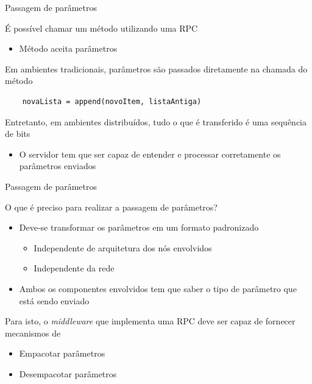 \documentclass[compress]{beamer}
\begin{document}
\begin{frame}[fragile]{Passagem de parâmetros}

É possível chamar um método utilizando uma RPC
\begin{itemize}
    \item Método aceita parâmetros
\end{itemize}

\vspace{0.5cm}

Em ambientes tradicionais, parâmetros são passados diretamente na chamada do método

\begin{verbatim}
    novaLista = append(novoItem, listaAntiga)
\end{verbatim}

Entretanto, em ambientes distribuídos, tudo o que é transferido é uma sequência  de bits
\begin{itemize}
    \item O servidor tem que ser capaz de entender e processar corretamente os parâmetros enviados
\end{itemize}
\end{frame}


\begin{frame}[fragile]{Passagem de parâmetros}

O que é preciso para realizar a passagem de parâmetros?
\begin{itemize}
    \item Deve-se transformar os parâmetros em um formato padronizado
    \begin{itemize}
        \item Independente de arquitetura dos nós envolvidos
        \item Independente da rede
    \end{itemize}
    \item Ambos os componentes envolvidos tem que saber o tipo de parâmetro que está sendo enviado
\end{itemize}

\vspace{0.5cm}

Para isto, o \textit{middleware} que implementa uma RPC deve ser capaz de fornecer mecanismos de
\begin{itemize}
    \item Empacotar parâmetros
    \item Desempacotar parâmetros
\end{itemize}
\end{frame}
\end{document}
